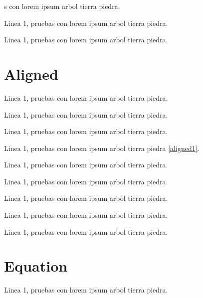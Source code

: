 s con lorem ipsum arbol tierra piedra.


Linea 1, pruebas con lorem ipsum arbol tierra piedra.


Linea 1, pruebas con lorem ipsum arbol tierra piedra.

\newpage
\insertemptypage
\section{Aligned}
Linea 1, pruebas con lorem ipsum arbol tierra piedra.


Linea 1, pruebas con lorem ipsum arbol tierra piedra.


Linea 1, pruebas con lorem ipsum arbol tierra piedra.

\insertaligned[\label{aligned1}]{arg2 \\ arg4}

Linea 1, pruebas con lorem ipsum arbol tierra piedra \eqref{aligned1}.


Linea 1, pruebas con lorem ipsum arbol tierra piedra.


Linea 1, pruebas con lorem ipsum arbol tierra piedra.


Linea 1, pruebas con lorem ipsum arbol tierra piedra.

\insertalignedcaptioned[\label{aligned3}]{arg2 \\ arg4}{}

Linea 1, pruebas con lorem ipsum arbol tierra piedra.


Linea 1, pruebas con lorem ipsum arbol tierra piedra.

\newpage
\section{Equation}
Linea 1, pruebas con lorem ipsum arbol tierra piedra.

